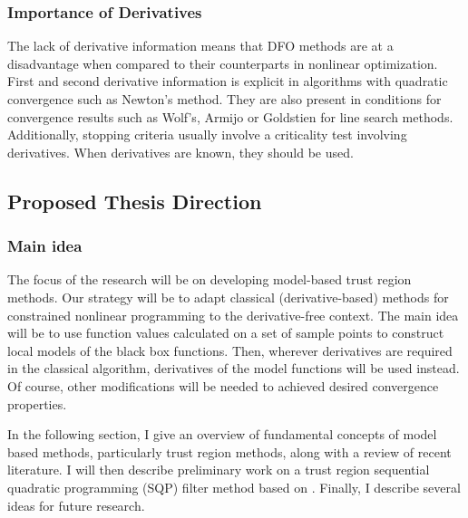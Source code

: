 \documentclass{article}
\begin{document}
\subsubsection{Importance of Derivatives}

The lack of derivative information means that DFO methods are at a disadvantage when compared to their counterparts in nonlinear optimization.
First and second derivative information is explicit in algorithms with quadratic convergence such as Newton's method.
They are also present in conditions for convergence results such as Wolf's, Armijo or Goldstien for line search methods.
Additionally, stopping criteria usually involve a criticality test involving derivatives.
When derivatives are known, they should be used.


\subsection{Proposed Thesis Direction}


\subsubsection{Main idea}

The focus of the research will be on developing model-based trust region methods.
Our strategy will be to adapt classical (derivative-based) methods for constrained nonlinear programming to the derivative-free context.
The main idea will be to use function values calculated on a set of sample points to construct local models of the black box functions.
Then, wherever derivatives are required in the classical algorithm, derivatives of the model functions will be used instead.
Of course, other modifications will be needed to achieved desired convergence properties.

In the following section, I give an overview of fundamental concepts of model based methods, particularly trust region methods, along with a review of recent literature.
I will then describe preliminary work on a trust region sequential quadratic programming (SQP) filter method based on \cite{DUMMY:SQPFilter}.
Finally, I describe several ideas for future research.

\end{document}
